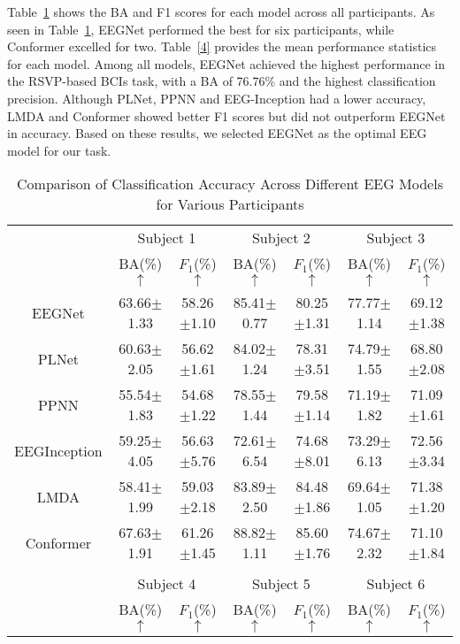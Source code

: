 \documentclass[preprint,12pt,authoryear]{elsarticle}
\begin{document}
Table~\ref{3} shows the BA and F1 scores for each model across all participants. As seen in Table~\ref{3}, EEGNet performed the best for six participants, while Conformer excelled for two. Table~\ref{4} provides the mean performance statistics for each model. Among all models, EEGNet achieved the highest performance in the RSVP-based BCIs task, with a BA of 76.76\% and the highest classification precision. Although PLNet, PPNN and EEG-Inception had a lower accuracy, LMDA and Conformer showed better F1 scores but did not outperform EEGNet in accuracy. Based on these results, we selected EEGNet as the optimal EEG model for our task.

\begin{table}[H]
\centering
\caption{Comparison of Classification Accuracy Across Different EEG Models for Various Participants}  %
\footnotesize  %
\label{3}
\setlength{\tabcolsep}{1mm}  %
\begin{tabular}{ccccccc}  %
\toprule
 & \multicolumn{2}{c}{Subject 1} & \multicolumn{2}{c}{Subject 2} & \multicolumn{2}{c}{Subject 3} \\
\cmidrule{2-3}\cmidrule{4-5}\cmidrule{6-7}
& BA(\%) $\uparrow$ & $F_1$(\%) $\uparrow$ & BA(\%) $\uparrow$ & $F_1$(\%) $\uparrow$ & BA(\%) $\uparrow$ & $F_1$(\%) $\uparrow$  \\ \midrule
EEGNet & 63.66$\pm$1.33 & 58.26$\pm$1.10 & 85.41$\pm$0.77 & 80.25$\pm$1.31 & 77.77$\pm$1.14 & 69.12$\pm$1.38 \\
PLNet & 60.63$\pm$2.05 & 56.62$\pm$1.61 & 84.02$\pm$1.24 & 78.31$\pm$3.51 & 74.79$\pm$1.55 & 68.80$\pm$2.08 \\
PPNN & 55.54$\pm$1.83 & 54.68$\pm$1.22 & 78.55$\pm$1.44 & 79.58$\pm$1.14 & 71.19$\pm$1.82 & 71.09$\pm$1.61 \\
EEGInception & 59.25$\pm$4.05 & 56.63$\pm$5.76 & 72.61$\pm$6.54 & 74.68$\pm$8.01 & 73.29$\pm$6.13 & 72.56$\pm$3.34 \\
LMDA & 58.41$\pm$1.99 & 59.03$\pm$2.18 & 83.89$\pm$2.50 & 84.48$\pm$1.86 & 69.64$\pm$1.05 & 71.38$\pm$1.20 \\
Conformer & 67.63$\pm$1.91 & 61.26$\pm$1.45 & 88.82$\pm$1.11 & 85.60$\pm$1.76 & 74.67$\pm$2.32 & 71.10$\pm$1.84 \\
\\
\toprule
 & \multicolumn{2}{c}{Subject 4} & \multicolumn{2}{c}{Subject 5} & \multicolumn{2}{c}{Subject 6} \\
\cmidrule{2-3}\cmidrule{4-5}\cmidrule{6-7}
& BA(\%) $\uparrow$ & $F_1$(\%) $\uparrow$ & BA(\%) $\uparrow$ & $F_1$(\%) $\uparrow$ & BA(\%) $\uparrow$ & $F_1$(\%) $\uparrow$ \\ \midrule

\end{tabular}
\end{table}
\end{document}
